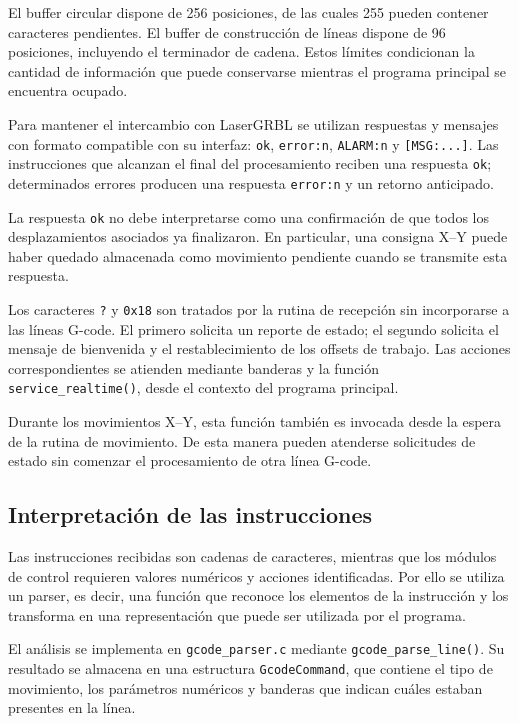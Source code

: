\documentclass[blue,fullpaper]{ludusofficial}  %
\begin{document}
El buffer circular dispone de 256 posiciones, de las
cuales 255 pueden contener caracteres pendientes.
El buffer de construcción de líneas dispone de 96
posiciones, incluyendo el terminador de cadena.
Estos límites condicionan la cantidad de información
que puede conservarse mientras el programa principal
se encuentra ocupado.

Para mantener el intercambio con LaserGRBL se utilizan
respuestas y mensajes con formato compatible con su
interfaz: \texttt{ok}, \texttt{error:n},
\texttt{ALARM:n} y \texttt{[MSG:...]}.
Las instrucciones que alcanzan el final del procesamiento
reciben una respuesta \texttt{ok}; determinados errores
producen una respuesta \texttt{error:n} y un retorno
anticipado.

La respuesta \texttt{ok} no debe interpretarse como
una confirmación de que todos los desplazamientos
asociados ya finalizaron. En particular, una consigna
X--Y puede haber quedado almacenada como movimiento
pendiente cuando se transmite esta respuesta.

Los caracteres \texttt{?} y \texttt{0x18} son tratados
por la rutina de recepción sin incorporarse a las líneas
G-code. El primero solicita un reporte de estado;
el segundo solicita el mensaje de bienvenida y
el restablecimiento de los offsets de trabajo.
Las acciones correspondientes se atienden mediante
banderas y la función \texttt{service\_realtime()},
desde el contexto del programa principal.

Durante los movimientos X--Y, esta función también
es invocada desde la espera de la rutina de movimiento.
De esta manera pueden atenderse solicitudes de estado
sin comenzar el procesamiento de otra línea G-code.

\subsection{Interpretación de las instrucciones}

Las instrucciones recibidas son cadenas de caracteres,
mientras que los módulos de control requieren valores
numéricos y acciones identificadas. Por ello se utiliza
un parser, es decir, una función que reconoce los
elementos de la instrucción y los transforma en una
representación que puede ser utilizada por el programa.

El análisis se implementa en \texttt{gcode\_parser.c}
mediante \texttt{gcode\_parse\_line()}. Su resultado
se almacena en una estructura \texttt{GcodeCommand},
que contiene el tipo de movimiento, los parámetros
numéricos y banderas que indican cuáles estaban
presentes en la línea.
\end{document}
